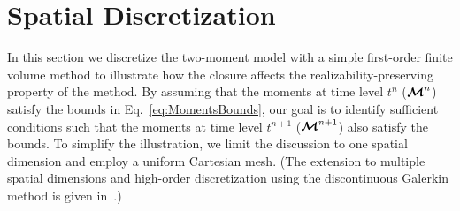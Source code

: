 \section{Spatial Discretization}\label{se:SpatialDiscretization}

In this section we discretize the two-moment model with a simple first-order finite volume method to illustrate how the closure affects the realizability-preserving property of the method.  
By assuming that the moments at time level $t^{n}$ ($\boldsymbol{\mathcal{M}}^{n}$) satisfy the bounds in Eq.~\eqref{eq:MomentsBounds}, our goal is to identify sufficient conditions such that the moments at time level $t^{n+1}$ ($\boldsymbol{\mathcal{M}}^{n+1}$) also satisfy the bounds.
To simplify the illustration, we limit the discussion to one spatial dimension and employ a uniform Cartesian mesh.  
(The extension to multiple spatial dimensions and high-order discretization using the discontinuous Galerkin method is given in~\cite{chu_etal_2018}.)

